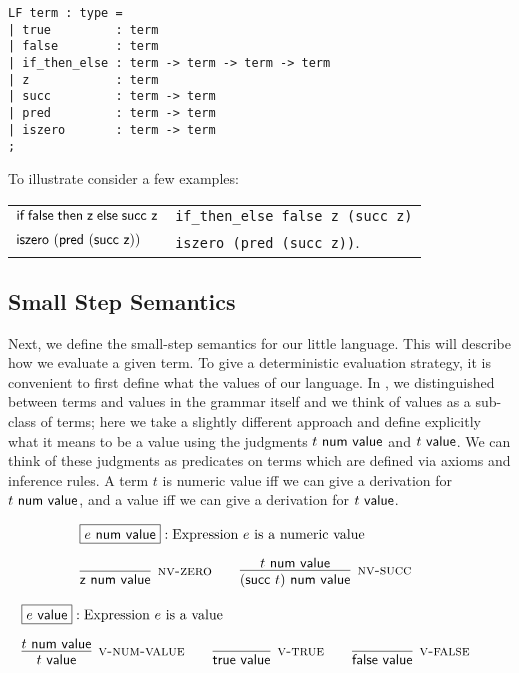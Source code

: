 \begin{lstlisting}
LF term : type =
| true         : term
| false        : term
| if_then_else : term -> term -> term -> term
| z            : term
| succ         : term -> term
| pred         : term -> term
| iszero       : term -> term
;
\end{lstlisting}

To illustrate consider a few examples:

\begin{tabular}{l@{\quad is represented as \quad}l}
$\textsf{if\;} \textsf{false} \textsf{\;then\;} \textsf{z} \textsf{\;else\;} \textsf{succ}~\textsf{z}$ &
\lstinline!if_then_else false z (succ z)!\\
$\textsf{iszero}~(\textsf{pred}~(\textsf{succ}~\textsf{z}))$ & \lstinline!iszero (pred (succ z))!.
\end{tabular}




\subsection{Small Step Semantics}

Next, we define the small-step semantics for our little language. This
will describe how we evaluate a given term. To give a deterministic
evaluation strategy, it is convenient to first define what the values
of our language. In \cite{TAPL}, we distinguished between terms and values in the
grammar itself and we think of values as a sub-class of terms; here we take a slightly
different approach and define explicitly what it means to be a value
using the judgments $t ~\mathsf{num~value}$ and $t ~\mathsf{value}$. We can think of these judgments
as predicates on terms which are defined via axioms and inference rules. A
term $t$ is numeric value iff we can give a derivation for $t ~\mathsf{num~value}$, and a
value iff we can give a derivation for $t ~\mathsf{value}$.

\[
\begin{array}{c}
\multicolumn{1}{l}{\fbox{$e \NumValue$}: \mbox{Expression $e$ is a numeric value}}\\[1em]
\infer[\NVZero]{\tmzero \NumValue}{} \qquad
\infer[\NVSucc]{(\tmsucc t) \NumValue}{t \NumValue} \qquad
\end{array}
\]

\[
\begin{array}{c}
\multicolumn{1}{l}{\fbox{$e \Value$}: \mbox{Expression $e$ is a value}}\\[1em]
\infer[\VNumValue]{t \Value}{t \NumValue} \qquad
\infer[\VTrue]{\tmtrue \Value}{} \qquad
\infer[\VFalse]{\tmfalse \Value}{} \qquad
\end{array}
\]

